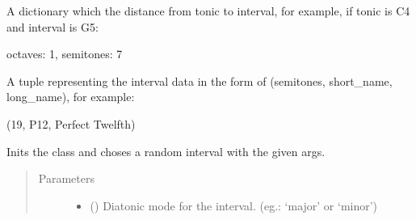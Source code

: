 \documentclass[letterpaper,10pt,english]{sphinxmanual}
\begin{document}
\begin{fulllineitems}
\begin{fulllineitems}
\end{fulllineitems}


\begin{fulllineitems}
\label{\detokenize{index:birdears.interval.DiatonicInterval.distance}}
 \textendash{} A dictionary which the distance from tonic to
interval, for example, if tonic is C4 and interval is G5:

\begin{sphinxVerbatim}[commandchars=\\\{\}]
\PYGZob{}
    \PYGZsq{}octaves\PYGZsq{}: 1,
    \PYGZsq{}semitones\PYGZsq{}: 7
\PYGZcb{}
\end{sphinxVerbatim}

\end{fulllineitems}


\begin{fulllineitems}
\label{\detokenize{index:birdears.interval.DiatonicInterval.data}}
 \textendash{} A tuple representing the interval data in the form of
(semitones, short\_name, long\_name), for example:

\begin{sphinxVerbatim}[commandchars=\\\{\}]
(19, \PYGZsq{}P12\PYGZsq{}, \PYGZsq{}Perfect Twelfth\PYGZsq{})
\end{sphinxVerbatim}

\end{fulllineitems}


\begin{fulllineitems}
\label{\detokenize{index:birdears.interval.DiatonicInterval.__init__}}
Inits the class and choses a random interval with the given args.
\begin{quote}\begin{description}
\item[{Parameters}] \leavevmode\begin{itemize}
\item {} 
 () \textendash{} Diatonic mode for the interval.
(eg.: ‘major’ or ‘minor’)


\end{itemize}
\end{description}
\end{quote}
\end{fulllineitems}
\end{fulllineitems}
\end{document}
